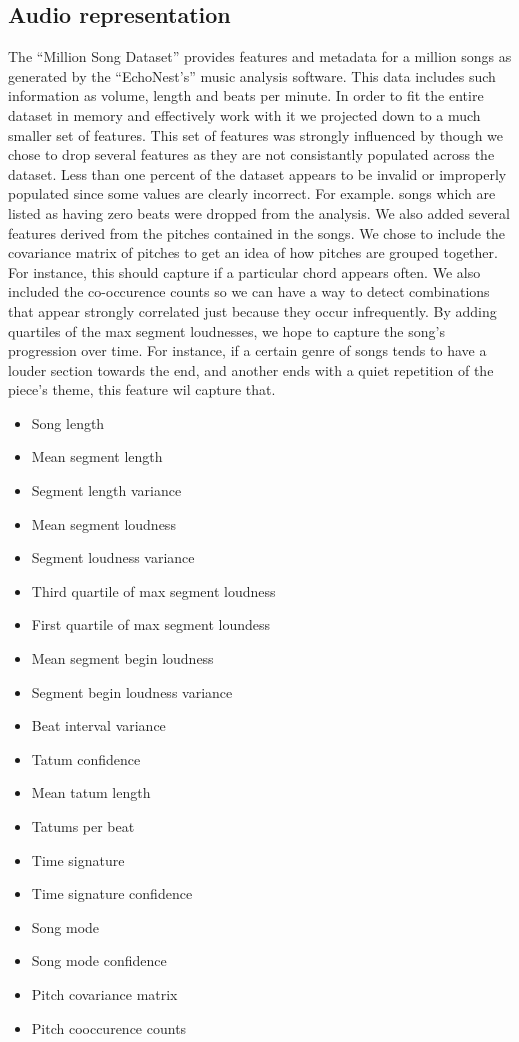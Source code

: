 \documentclass[a4paper,10pt]{article}
\begin{document}
\subsection{Audio representation}
The ``Million Song Dataset'' provides features and metadata for a million songs as generated by the ``EchoNest's'' music analysis software. This data includes such information as volume, length and beats per minute. In order to fit the entire dataset in memory and effectively work with it we projected down to a much smaller set of features. This set of features was strongly influenced by \cite{Slaney_learninga} though we chose to drop several features as they are not consistantly populated across the dataset. Less than one percent of the dataset appears to be invalid or improperly populated since some values are clearly incorrect. For example. songs which are listed as having zero beats were dropped from the analysis. We also added several features derived from the pitches contained in the songs. We chose to include the covariance matrix of pitches to get an idea of how pitches are grouped together. For instance, this should capture if a particular chord appears often. We also included the co-occurence counts so we can have a way to detect combinations that appear strongly correlated just because they occur infrequently. By adding quartiles of the max segment loudnesses, we hope to capture the song's progression over time. For instance, if a certain genre of songs tends to have a louder section towards the end, and another ends with a quiet repetition of the piece's theme, this feature wil capture that.

\begin{itemize}
 \item Song length
 \item Mean segment length
 \item Segment length variance
 \item Mean segment loudness
 \item Segment loudness variance
 \item Third quartile of max segment loudness 
 \item First quartile of max segment loundess
 \item Mean segment begin loudness
 \item Segment begin loudness variance
 \item Beat interval variance
 \item Tatum confidence
 \item Mean tatum length
 \item Tatums per beat
 \item Time signature
 \item Time signature confidence
 \item Song mode
 \item Song mode confidence
 \item Pitch covariance matrix
 \item Pitch cooccurence counts
\end{itemize}
\end{document}
